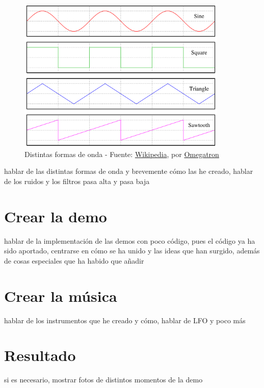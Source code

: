 \begin{figure}[h]
	\centering
	\includegraphics[width=10cm]{archivos/waves}
	\caption{Distintas formas de onda - Fuente: \href{https://upload.wikimedia.org/wikipedia/commons/6/6f/Waveforms.png}{Wikipedia}, por \href{https://commons.wikimedia.org/wiki/User:Omegatron}{Omegatron}}
	\label{fig:waves}
\end{figure}

hablar de las distintas formas de onda y brevemente cómo las he creado, hablar de los ruidos y los filtros pasa alta y pasa baja

\section{Crear la demo}

hablar de la implementación de las demos con poco código, pues el código ya ha sido aportado, centrarse en cómo se ha unido y las ideas que han surgido, además de cosas especiales que ha habido que añadir

\section{Crear la música}

hablar de los instrumentos que he creado y cómo, hablar de LFO y poco más

\section{Resultado}

si es necesario, mostrar fotos de distintos momentos de la demo